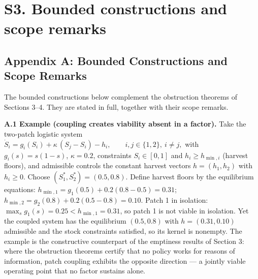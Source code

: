 \documentclass[11pt]{article}
\theoremstyle{definition}
\begin{document}
\section*{S3. Bounded constructions and scope remarks}

\subsection{Appendix A: Bounded Constructions and Scope
Remarks}\label{appendix-a-bounded-constructions-and-scope-remarks}

The bounded constructions below complement the obstruction theorems of Sections 3--4. They are stated in full, together with their scope remarks.

\textbf{A.1 Example (coupling creates viability absent in a factor).}
Take the two-patch logistic system
\(\dot S_i = g_i(S_i) + \kappa\,(S_j - S_i) - h_i, \qquad i, j \in \{1,2\},\ i \ne j,\)
with \(g_i(s) = s(1-s)\), \(\kappa = 0.2\), constraints \(S_i \in [0,1]\) and \(h_i \ge h_{\min,i}\) (harvest floors), and admissible controls the constant harvest vectors \(h = (h_1, h_2)\) with \(h_i \ge 0\). Choose
\((S_1^*, S_2^*) = (0.5, 0.8)\). Define harvest floors by the equilibrium equations: \(h_{\min,1} = g_1(0.5) + 0.2(0.8 - 0.5) = 0.31\); \(h_{\min,2} = g_2(0.8) + 0.2(0.5 - 0.8) = 0.10\). Patch 1 in isolation:
\(\max_s g_1(s) = 0.25 < h_{\min,1} = 0.31\), so patch 1 is not viable
in isolation. Yet the coupled system has the equilibrium \((0.5, 0.8)\)
with \(h = (0.31, 0.10)\) admissible and the stock constraints
satisfied, so its kernel is nonempty. The example is the constructive
counterpart of the emptiness results of Section 3: where the obstruction
theorems certify that no policy works for reasons of information, patch
coupling exhibits the opposite direction --- a jointly viable operating
point that no factor sustains alone.
\end{document}

